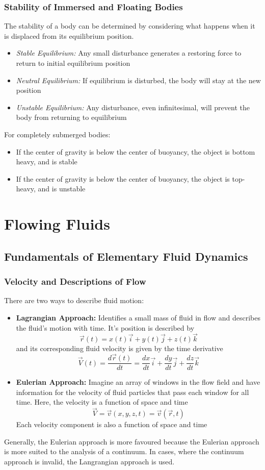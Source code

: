 \documentclass[11pt]{article}
\begin{document}
\subsubsection{Stability of Immersed and Floating Bodies}
The stability of a body can be determined by considering what happens when it is displaced from its equilibrium position.
\begin{itemize}
\item \textit{Stable Equilibrium:} Any small disturbance generates a restoring force to return to initial equilibrium position
\item \textit{Neutral Equilibrium:} If equilibrium is disturbed, the body will stay at the new position 
\item \textit{Unstable Equilibrium:} Any disturbance, even infinitesimal, will prevent the body from returning to equilibrium 
\end{itemize}
For completely submerged bodies:
\begin{itemize}
\item If the center of gravity is below the center of buoyancy, the object is bottom heavy, and is stable
\item If the center of gravity is below the center of buoyancy, the object is top-heavy, and is unstable
\end{itemize}

\section{Flowing Fluids}

\subsection{Fundamentals of Elementary Fluid Dynamics}
\subsubsection{Velocity and Descriptions of Flow}
There are two ways to describe fluid motion:
\begin{itemize}
\item \textbf{Lagrangian Approach: }Identifies a small mass of fluid in flow and describes the fluid's motion with time. It's position is described by 
$$ \vec{r}(t) = x(t)\vec{i}+y(t)\vec{j}+z(t)\vec{k}$$  and its corresponding fluid velocity is given by the time derivative
$$\vec{V}(t) = \frac{d\vec{r}(t)}{dt} = \frac{dx}{dt} \vec{i} + \frac{dy}{dt} \vec{j} + \frac{dz}{dt} \vec{k}$$
\item \textbf{Eulerian Approach:} Imagine an array of windows in the flow field and have information for the velocity of fluid particles that pass each window for all time. Here, the velocity is a function of space and time $$ \vec{V}=\vec{v}(x,y,z,t) = \vec{v}(\vec{r}, t)$$ Each velocity component is also a function of space and time
\end{itemize}
Generally, the Eulerian approach is more favoured because the Eulerian approach is more suited to the analysis of a continuum. In cases, where the continuum approach is invalid, the Langrangian approach is used.
\end{document}
